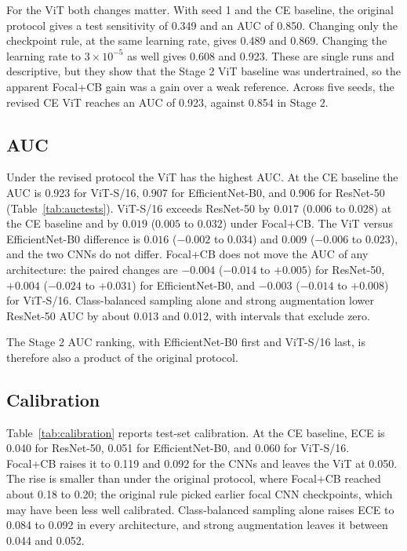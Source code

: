 For the ViT both changes matter. With seed 1 and the CE baseline, the original protocol gives a test sensitivity of 0.349 and an AUC of 0.850. Changing only the checkpoint rule, at the same learning rate, gives 0.489 and 0.869. Changing the learning rate to $3\times10^{-5}$ as well gives 0.608 and 0.923. These are single runs and descriptive, but they show that the Stage 2 ViT baseline was undertrained, so the apparent Focal+CB gain was a gain over a weak reference. Across five seeds, the revised CE ViT reaches an AUC of 0.923, against 0.854 in Stage 2.

\subsection{AUC}
\label{sec:auc}

Under the revised protocol the ViT has the highest AUC. At the CE baseline the AUC is 0.923 for ViT-S/16, 0.907 for EfficientNet-B0, and 0.906 for ResNet-50 (Table~\ref{tab:auctests}). ViT-S/16 exceeds ResNet-50 by $0.017$ ($0.006$ to $0.028$) at the CE baseline and by $0.019$ ($0.005$ to $0.032$) under Focal+CB. The ViT versus EfficientNet-B0 difference is $0.016$ ($-0.002$ to $0.034$) and $0.009$ ($-0.006$ to $0.023$), and the two CNNs do not differ. Focal+CB does not move the AUC of any architecture: the paired changes are $-0.004$ ($-0.014$ to $+0.005$) for ResNet-50, $+0.004$ ($-0.024$ to $+0.031$) for EfficientNet-B0, and $-0.003$ ($-0.014$ to $+0.008$) for ViT-S/16. Class-balanced sampling alone and strong augmentation lower ResNet-50 AUC by about 0.013 and 0.012, with intervals that exclude zero.

The Stage 2 AUC ranking, with EfficientNet-B0 first and ViT-S/16 last, is therefore also a product of the original protocol.



\subsection{Calibration}

Table~\ref{tab:calibration} reports test-set calibration. At the CE baseline, ECE is 0.040 for ResNet-50, 0.051 for EfficientNet-B0, and 0.060 for ViT-S/16. Focal+CB raises it to 0.119 and 0.092 for the CNNs and leaves the ViT at 0.050. The rise is smaller than under the original protocol, where Focal+CB reached about 0.18 to 0.20; the original rule picked earlier focal CNN checkpoints, which may have been less well calibrated. Class-balanced sampling alone raises ECE to 0.084 to 0.092 in every architecture, and strong augmentation leaves it between 0.044 and 0.052.

